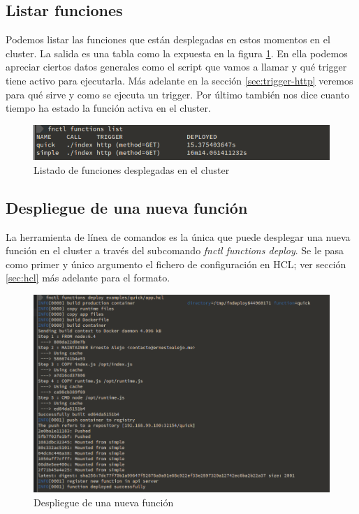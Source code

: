 \subsection{Listar funciones}

Podemos listar las funciones que están desplegadas en estos momentos en el cluster. La salida es una tabla como la expuesta en la figura \ref{fig:fnctl-list}. En ella podemos apreciar ciertos datos generales como el script que vamos a llamar y qué trigger tiene activo para ejecutarla. Más adelante en la sección \ref{sec:trigger-http} veremos para qué sirve y como se ejecuta un trigger. Por último también nos dice cuanto tiempo ha estado la función activa en el cluster.

\smallskip

\begin{figure}[H]
    \centering
    \includegraphics[width=\textwidth]{../images/fnctl/list.png}
    \caption{Listado de funciones desplegadas en el cluster}
    \label{fig:fnctl-list}
\end{figure}

\subsection{Despliegue de una nueva función}

La herramienta de línea de comandos es la única que puede desplegar una nueva función en el cluster a través del subcomando \emph{fnctl functions deploy}. Se le pasa como primer y único argumento el fichero de configuración en HCL; ver sección \ref{sec:hcl} más adelante para el formato.

\begin{figure}[H]
    \centering
    \includegraphics[width=\textwidth]{../images/fnctl/deploy.png}
    \caption{Despliegue de una nueva función}
    \label{fig:fnctl-deploy}
\end{figure}

